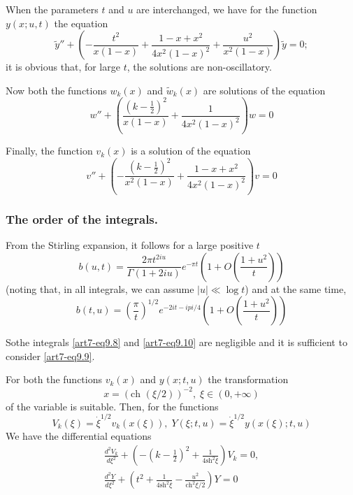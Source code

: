 When the parameters $t$ and $u$ are interchanged, we have for the function $y(x; u, t)$ the equation 
\begin{equation}
\tilde{y}'' + \left(-\frac{t^2}{x(1-x)} + \frac{1-x+x^2}{4x^2 (1-x)^2} + \frac{u^2}{x^2 (1-x)} \right) \tilde{y} = 0; \label{art7-eq9.12}
\end{equation}
it is obvious that, for large $t$, the solutions are non-oscillatory.

Now both the functions $w_k(x)$ and $\tilde{w}_k(x)$ are solutions of the equation 
\begin{equation}
w'' + \left(\frac{(k-\frac{1}{2})^2}{x(1-x)} + \frac{1}{4x^2(1-x)^2 } \right) w = 0\label{art7-eq9.13}
\end{equation}

Finally, the function $v_k(x)$ is a solution of the equation
\begin{equation}
v'' + \left(- \frac{(k -\frac{1}{2})^2}{x^2 (1-x)} + \frac{1-x+x^2}{4x^2 (1-x)^2} \right) v = 0 \label{art7-eq9.14}
\end{equation}


\setcounter{section}{2}
\subsubsection{The order of the integrals.}\label{art7-subusbsec2.8.3}
From the Stirling expansion, it follows for a large positive $t$
\setcounter{section}{9}
\begin{equation}
b(u,t)  =\frac{2\pi t^{2iu}}{\Gamma (1+ 2iu)} e^{-\pi t} \left(1+O \left(\frac{1+u^2}{t} \right)\right) \label{art7-eq9.15}
\end{equation}
(noting that, in all integrals, we can assume $|u| \ll \log t$) and at the same time,
\begin{equation}
b(t,u)  = \left(\frac{\pi}{t} \right)^{1/2} e^{-2it - i pi/4} \left(1+O\left(\frac{1+u^2}{t} \right) \right)\label{art7-eq9.16}
\end{equation}

So\pageoriginale the integrals \eqref{art7-eq9.8} and \eqref{art7-eq9.10} are negligible and it is sufficient to consider \eqref{art7-eq9.9}.

For both the functions $v_k(x)$ and $y(x; t, u)$ the transformation
\begin{equation}
x = (\text{ch } (\xi/2))^{-2}, \; \xi \in (0,+ \infty) \label{art7-eq9.17}
\end{equation}
of the variable is suitable. Then, for the functions
\begin{equation}
V_k(\xi) = \dot{\xi}^{1/2} v_k(x (\xi)), \; Y (\xi; t, u) = \dot{\xi}^{1/2} y(x (\xi); t, u)\label{art7-eq9.18}
\end{equation}
We have the differential equations
\begin{gather}
\frac{d^2 V_k}{d\xi^2} + \left(-\left(k -\frac{1}{2} \right)^2 + \frac{1}{4 \text{sh}^2 \xi} \right) V_k = 0, \label{art7-eq9.19} \\
\frac{d^2 Y}{d\xi^2} + \left(t^2 + \frac{1}{4 \text{sh}^2 \xi} - \frac{u^2}{\text{ch}^2 \xi/2} \right) Y =0\label{art7-eq9.20}
\end{gather}


